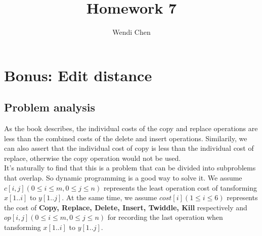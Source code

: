 \documentclass[a4paper]{article}
\title{\textbf{Homework 7}}
\author{Wendi Chen}
\date{}
\begin{document}
\maketitle

\section{Bonus: Edit distance}
\subsection{Problem analysis}
As the book describes, the individual costs of
the copy and replace operations are less than the combined costs of the delete and
insert operations.
Similarily, we can also assert that the individual cost of copy is
less than the individual cost of replace, otherwise the copy operation
would not be used.\\

It's naturally to find that this is a problem that can be divided
into subproblems that overlap. So dynamic programming is a good way to solve it.
We assume $c[i,j](0 \leq i \leq m, 0 \leq j \leq n)$ represents the least operation cost of tansforming
$x[1..i]$ to $y[1..j]$. At the same time, we assume $cost[i] (1 \leq i \leq 6)$ represents
the cost of \textbf{Copy, Replace, Delete, Insert, Twiddle, Kill} respectively and
$op[i,j](0 \leq i \leq m, 0 \leq j \leq n)$ for recording the last operation when
tansforming $x[1..i]$ to $y[1..j]$.
\end{document}
